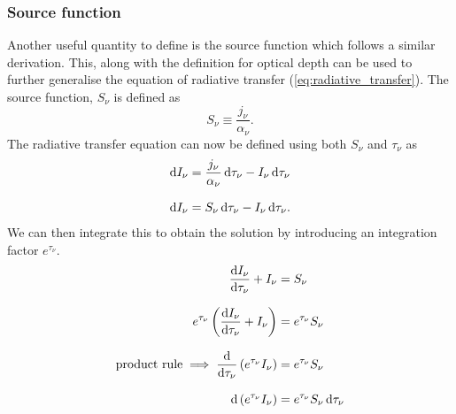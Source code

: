 \subsubsection{Source function}
Another useful quantity to define is the source function which follows a similar derivation. %
This, along with the definition for optical depth can be used to further generalise the equation of radiative transfer (\ref{eq:radiative_transfer}).
 The source function, $S_\nu$ is defined as
%
\begin{equation}
	S_\nu \equiv \frac{j_\nu}{\alpha_\nu}.
\end{equation}
%
The radiative transfer equation can now be defined using both $S_\nu$ and $\tau_\nu$ as
%
\begin{align*}
	\diff I_\nu &= \frac{j_\nu}{\alpha_\nu} \diff \tau_\nu - I_\nu \diff \tau_\nu
	\linedrop
	\diff I_\nu &= S_\nu \diff \tau_\nu - I_\nu \diff \tau_\nu.
\end{align*}
%
We can then integrate this to obtain the solution by introducing an integration factor $e^{\tau_\nu}$.
%
\begin{align*}
	\frac{\diff I_\nu}{\diff \tau_\nu} + I_\nu &= S_\nu
	\linedrop
	e^{\tau_\nu} \left( \frac{\diff I_\nu}{\diff \tau_\nu} + I_\nu \right) &= e^{\tau_\nu} S_\nu
	\linedrop
	\text{product rule} \implies 
	\frac{\diff}{\diff \tau_\nu} \left( e^{\tau_\nu} I_\nu \right) &= e^{\tau_\nu} S_\nu
	\linedrop
	\diff \left( e^{\tau_\nu} I_\nu \right) &= e^{\tau_\nu} S_\nu \diff \tau_\nu
\end{align*}

